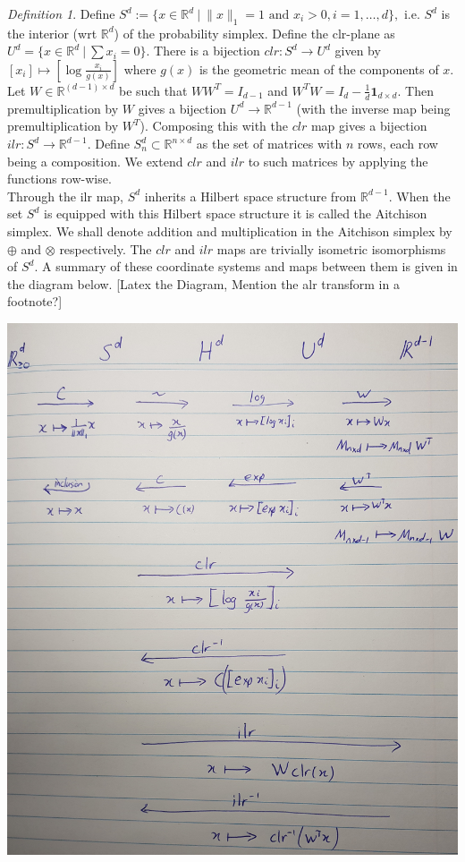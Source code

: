 \documentclass[BSc]{usydthesis}
\numberwithin{equation}{chapter}
\theoremstyle{remark}
\newtheorem{Definition}[equation]{Definition}
\begin{document}
\begin{Definition}
Define $S^d := \{ x \in \mathbb{R}^d \ | \ \| x \|_1 = 1 \text{ and } x_i>0, i=1,\ldots, d\},$ i.e. $S^d$ is the interior (wrt $\mathbb{R}^d$) of the probability simplex. Define the clr-plane as $U^d = \{ x \in \mathbb{R}^d \ | \ \sum x_i = 0\}.$ There is a bijection $clr : S^d \to U^d$ given by $[x_i] \mapsto [\log \frac{x_i}{g(x)}]$
where $g(x)$ is the geometric mean of the components of $x.$ Let $W\in \mathbb{R}^{(d-1)\times d}$ be such that $WW^T= I_{d-1}$ and $W^TW = I_d - \frac{1}{d} \mathbf{1}_{d\times d}.$ Then premultiplication by $W$ gives a bijection $U^d \to \mathbb{R}^{d-1}$ (with the inverse map being premultiplication by $W^T$). Composing this with the $clr$ map gives a bijection $ilr: S^d \to \mathbb{R}^{d-1}.$ Define $S^d_n \subset \mathbb{R}^{n \times d}$ as the set of matrices with $n$ rows, each row being a composition. We extend $clr$ and $ilr$ to such matrices by applying the functions row-wise. \
\\
Through the ilr map, $S^d$ inherits a Hilbert space structure from $\mathbb{R}^{d-1}.$ When the set $S^d$ is equipped with this Hilbert space structure it is called the Aitchison simplex. We shall denote addition and multiplication in the Aitchison simplex by $\oplus$ and $\otimes$ respectively. The $clr$ and $ilr$ maps are trivially isometric isomorphisms of $S^d.$ A summary of these coordinate systems and maps between them is given in the diagram below. [Latex the Diagram,  Mention the alr transform in a footnote?]
\end{Definition}

\begin{center}
 \includegraphics[scale=0.17]{./maps.jpg}
\end{center}
\end{document}
